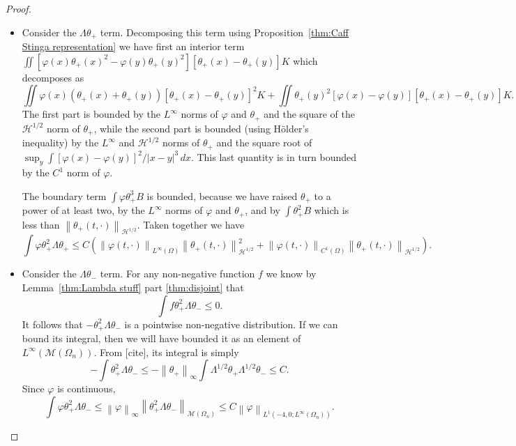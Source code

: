 \documentclass[11pt]{amsart}
\theoremstyle{remark}
\theoremstyle{definition}
\newcommand{\norm}[1]{\left\lVert#1\right\rVert}
\newcommand{\paren}[1]{\left( #1 \right)}
\newcommand{\HD}{\mathcal{H}}
\begin{document}
\begin{proof}
\begin{itemize}
\item Consider the $\Lambda \theta_+$ term.  Decomposing this term using Proposition~\ref{thm:Caff Stinga representation} we have first an interior term $\iint [\varphi(x)\theta_+(x)^2 - \varphi(y)\theta_+(y)^2][\theta_+(x)-\theta_+(y)] K$ which decomposes as
\[ \iint \varphi(x)(\theta_+(x)+\theta_+(y))[\theta_+(x)-\theta_+(y)]^2 K + \iint \theta_+(y)^2 [\varphi(x)-\varphi(y)][\theta_+(x)-\theta_+(y)] K. \]
The first part is bounded by the $L^\infty$ norms of $\varphi$ and $\theta_+$ and the square of the $\HD^{1/2}$ norm of $\theta_+$, while the second part is bounded (using H\"{o}lder's inequality) by the $L^\infty$ and $\HD^{1/2}$ norms of $\theta_+$ and the square root of $\sup_y \int [\varphi(x)-\varphi(y)]^2/|x-y|^3 \,dx$.  This last quantity is in turn bounded by the $C^1$ norm of $\varphi$.  

The boundary term $\int \varphi \theta_+^3 B$ is bounded, because we have raised $\theta_+$ to a power of at least two, by the $L^\infty$ norms of $\varphi$ and $\theta_+$, and by $\int \theta_+^2 B$ which is less than $\norm{\theta_+(t,\cdot)}_{\HD^{1/2}}$.  Taken together we have
\[ \int \varphi \theta_+^2 \Lambda \theta_+ \leq C \paren{ \norm{\varphi(t,\cdot)}_{L^\infty(\Omega)} \norm{\theta_+(t,\cdot)}_{\HD^{1/2}}^2 + \norm{\varphi(t,\cdot)}_{C^1(\Omega)} \norm{\theta_+(t,\cdot)}_{\HD^{1/2}} }. \]

\item Consider the $\Lambda\theta_-$ term.  For any non-negative function $f$ we know by Lemma~\ref{thm:Lambda stuff} part \ref{thm:disjoint} that
\[ \int f \theta_+^2 \Lambda \theta_- \leq 0. \]
It follows that $-\theta_+^2 \Lambda \theta_-$ is a pointwise non-negative distribution.  If we can bound its integral, then we will have bounded it as an element of $L^\infty(\mathcal{M}(\Omega_n))$.  
From [cite], its integral is simply
\[ -\int \theta_+^2 \Lambda \theta_- \leq - \norm{\theta_+}_\infty \int \Lambda^{1/2} \theta_+ \Lambda^{1/2} \theta_- \leq C. \]
Since $\varphi$ is continuous, 
\[ \int \varphi \theta_+^2 \Lambda \theta_- \leq \norm{\varphi}_\infty \norm{\theta_+^2 \Lambda \theta_-}_{\mathcal{M}(\Omega_n)} \leq C \norm{\varphi}_{L^1(-4,0; L^\infty(\Omega_n))}. \]


\end{itemize}
\end{proof}
\end{document}
